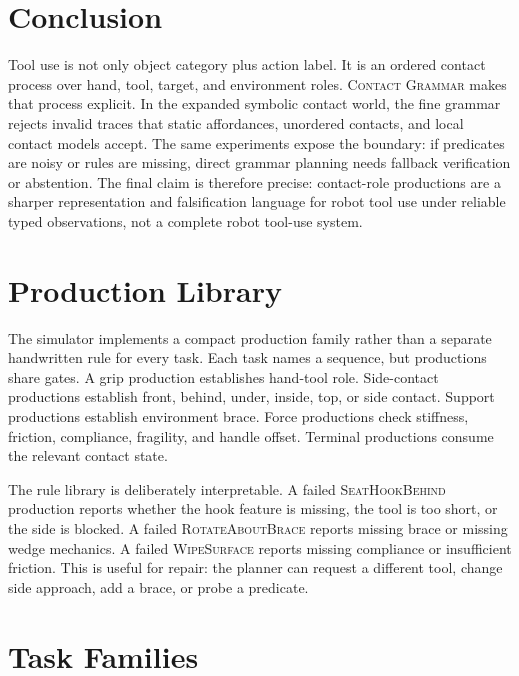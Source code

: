 \documentclass{article}
\newcommand{\CG}{\textsc{Contact Grammar}}
\begin{document}
\section{Conclusion}

Tool use is not only object category plus action label. It is an ordered contact process over hand, tool, target, and environment roles. \CG{} makes that process explicit. In the expanded symbolic contact world, the fine grammar rejects invalid traces that static affordances, unordered contacts, and local contact models accept. The same experiments expose the boundary: if predicates are noisy or rules are missing, direct grammar planning needs fallback verification or abstention. The final claim is therefore precise: contact-role productions are a sharper representation and falsification language for robot tool use under reliable typed observations, not a complete robot tool-use system.




\appendix
\renewcommand{\thesection}{A\arabic{section}}
\renewcommand{\thesubsection}{A\arabic{section}.\arabic{subsection}}

\section{Production Library}

The simulator implements a compact production family rather than a separate handwritten rule for every task. Each task names a sequence, but productions share gates. A grip production establishes hand-tool role. Side-contact productions establish front, behind, under, inside, top, or side contact. Support productions establish environment brace. Force productions check stiffness, friction, compliance, fragility, and handle offset. Terminal productions consume the relevant contact state.

The rule library is deliberately interpretable. A failed \textsc{SeatHookBehind} production reports whether the hook feature is missing, the tool is too short, or the side is blocked. A failed \textsc{RotateAboutBrace} reports missing brace or missing wedge mechanics. A failed \textsc{WipeSurface} reports missing compliance or insufficient friction. This is useful for repair: the planner can request a different tool, change side approach, add a brace, or probe a predicate.

\section{Task Families}
\end{document}
